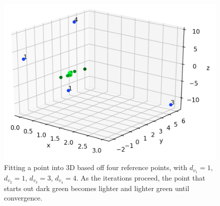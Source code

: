 \documentclass[journal]{vgtc}                %
\begin{document}
\begin{figure}[tb]
 \centering %
 \includegraphics[width=\linewidth]{point_fitting.png}
 \caption{Fitting a point into 3D based off four reference points, with $d_{v_1}=1$, $d_{v_2}=1$, $d_{v_3}=3$, $d_{v_4}=4$.  As the iterations proceed, the point that starts out dark green becomes lighter and lighter green until convergence.}
 \label{fig:point_fitting}
\end{figure}
\end{document}
